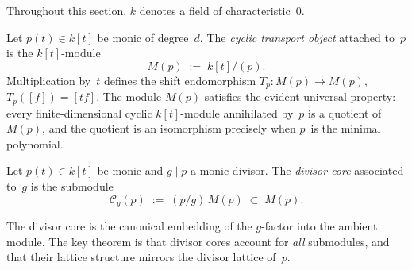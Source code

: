 Throughout this section, $k$ denotes a field of
characteristic~$0$.

\begin{definition}
\label{def:cyclic-transport-object}
Let $p(t) \in k[t]$ be monic of degree~$d$. The \emph{cyclic
transport object} attached to~$p$ is the $k[t]$-module
\[
M(p) \;:=\; k[t]/(p).
\]
Multiplication by~$t$ defines the shift endomorphism
$T_p \colon M(p) \to M(p)$, $T_p([f]) = [tf]$. The module
$M(p)$ satisfies the evident universal property: every
finite-dimensional cyclic $k[t]$-module annihilated by~$p$ is
a quotient of~$M(p)$, and the quotient is an isomorphism
precisely when $p$~is the minimal polynomial.
\end{definition}

\begin{definition}
\label{def:divisor-core}
Let $p(t) \in k[t]$ be monic and $g \mid p$ a monic divisor.
The \emph{divisor core} associated to~$g$ is the submodule
\[
\mathcal{C}_g(p)
 \;:=\;
 (p/g)\,M(p)
 \;\subset\; M(p).
\]
\end{definition}

The divisor core is the canonical embedding of the
$g$-factor into the ambient module. The key theorem is that
divisor cores account for \emph{all} submodules, and that
their lattice structure mirrors the divisor lattice of~$p$.

